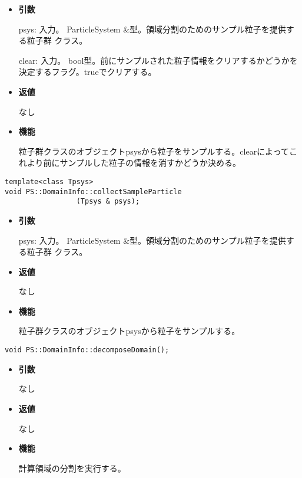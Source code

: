 \begin{itemize}

\item {\bf 引数}

psys: 入力。 ParticleSystem \&型。領域分割のためのサンプル粒子を提供する粒子群
クラス。

clear: 入力。 bool型。前にサンプルされた粒子情報をクリアするかどうかを
決定するフラグ。trueでクリアする。

\item {\bf 返値}

なし

\item {\bf 機能}

粒子群クラスのオブジェクトpsysから粒子をサンプルする。clearによってこ
れより前にサンプルした粒子の情報を消すかどうか決める。

\end{itemize}

\begin{screen}
\begin{verbatim}
template<class Tpsys>
void PS::DomainInfo::collectSampleParticle
                 (Tpsys & psys);
\end{verbatim}
\end{screen}

\begin{itemize}

\item {\bf 引数}

psys: 入力。 ParticleSystem \&型。領域分割のためのサンプル粒子を提供する粒子群
クラス。

\item {\bf 返値}

なし

\item {\bf 機能}

粒子群クラスのオブジェクトpsysから粒子をサンプルする。

\end{itemize}


\begin{screen}
\begin{verbatim}
void PS::DomainInfo::decomposeDomain();
\end{verbatim}
\end{screen}

\begin{itemize}

\item {\bf 引数}

なし

\item {\bf 返値}

なし

\item {\bf 機能}

計算領域の分割を実行する。

\end{itemize}

